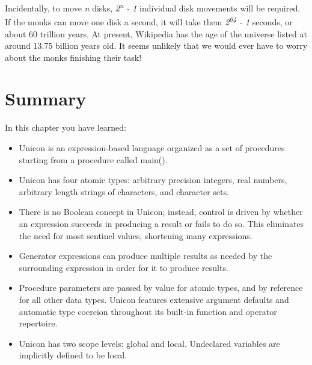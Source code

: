 Incidentally, to move \textit{n} disks,
\textit{2}\textit{\textsuperscript{n}}\textit{ - 1} individual disk
movements will be required. If the monks can move one disk a second, it
will take them \textit{2}\textit{\textsuperscript{64}}\textit{ - 1}
seconds, or about 60 trillion years. At present, Wikipedia has the age of
the universe listed at around 13.75 billion years old. It seems unlikely
that we would ever have to worry about the monks finishing their
task!

\section*{Summary}

In this chapter you have learned:

\begin{itemize}
\item Unicon is an expression-based language organized as a set of
procedures starting from a procedure called \textsf{main()}.

\item Unicon has four atomic types: arbitrary precision integers, real
numbers, arbitrary length strings of characters, and character sets.

\item There is no Boolean concept in Unicon; instead, control is driven
by whether an expression succeeds in producing a result or
fails to do so. This eliminates the need for most
sentinel values, shortening many expressions.

\item {}Generator expressions can produce multiple
results as needed by the surrounding expression in order for it to
produce results.

\item Procedure parameters are passed by value for atomic types, and by
reference for all other data types. Unicon features extensive argument
defaults and automatic type coercion throughout its built-in function
and operator repertoire.

\item Unicon has two scope levels: global and local. Undeclared
variables are implicitly defined to be local.
\end{itemize}

\bigskip
